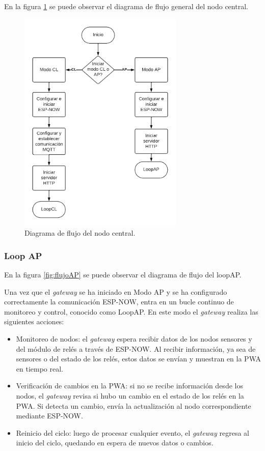 En la figura \ref{fig:flujoCentral} se puede observar el diagrama de flujo general del nodo central. 

\begin{figure}[H]
\centering 
\includegraphics[width=0.7\textwidth]{./Figures/flujo_central.png}
\caption{Diagrama de flujo del nodo central.}
\label{fig:flujoCentral}
\end{figure}

\subsubsection{Loop AP}

En la figura \ref{fig:flujoAP} se puede observar el diagrama de flujo del loopAP. 

Una vez que el \textit{gateway} se ha iniciado en Modo AP y se ha configurado correctamente la comunicación ESP-NOW, entra en un bucle continuo de monitoreo y control, conocido como LoopAP. En este modo el \textit{gateway} realiza las siguientes acciones:

\begin{itemize}
	\item Monitoreo de nodos: el \textit{gateway} espera recibir datos de los nodos sensores y del módulo de relés a través de ESP-NOW. Al recibir información, ya sea de sensores o del estado de los relés, estos datos se envían y muestran en la PWA en tiempo real.
	\item Verificación de cambios en la PWA: si no se recibe información desde los nodos, el \textit{gateway} revisa si hubo un cambio en el estado de los relés en la PWA. Si detecta un cambio, envía la actualización al nodo correspondiente mediante ESP-NOW.
	\item Reinicio del ciclo: luego de procesar cualquier evento, el \textit{gateway} regresa al inicio del ciclo, quedando en espera de nuevos datos o cambios.
\end{itemize}


